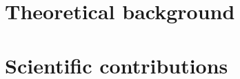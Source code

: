 \documentclass[14pt,oneside]{extreport}   %
\begin{document}


\tableofcontents                  %
\listoftables                     %
\listoffigures                    %


\cleardoublepage
{}


\part{Theoretical background}




\part{Scientific contributions}




% 



\end{document}
